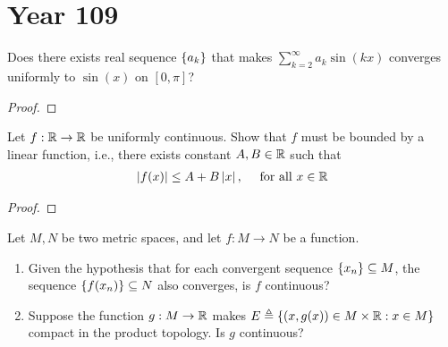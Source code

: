 \documentclass{report}
\begin{document}
\section{Year 109}
\begin{question}{}{}
Does there exists real sequence $\left\{ a_k \right\}$ that makes $\sum_{k=2}^{\infty}a_k \sin (kx)$ converges uniformly to $\sin (x)$ on $[0,\pi ]$? 
\end{question}
\begin{proof}

\end{proof}
\begin{question}{}{}
Let $f:\mathbb{R}\rightarrow \mathbb{R}$ be uniformly continuous. Show that $f$ must be bounded by a linear function, i.e., there exists constant $A,B \in\mathbb{R}$ such that 
\begin{align*}
\left|f(x)\right|\leq A+ B\left|x\right|,\quad \text{ for all }x\in\mathbb{R}
\end{align*}
\end{question}
\begin{proof}

\end{proof}
\begin{question}{}{}
Let $M,N$ be two metric spaces, and let $f:M\rightarrow N$ be a function. 
 \begin{enumerate}[label=(\roman*)]
  \item Given the hypothesis that for each convergent sequence $\left\{ x_n \right\}\subseteq M$, the sequence $\left\{ f(x_n) \right\}\subseteq N$ also converges, is $f$ continuous? 
  \item Suppose the function $g:M\rightarrow \mathbb{R}$ makes $E\triangleq \left\{ (x,g(x))\in M\times \mathbb{R}:x\in M \right\}$ compact in the product topology. Is $g$ continuous? 
\end{enumerate}
\end{question}
\end{document}
